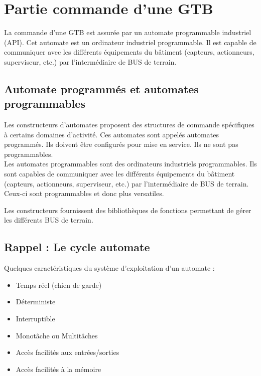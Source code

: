 \section{Partie commande d'une GTB}

La commande d'une GTB est assurée par un automate programmable industriel (API). Cet automate est un ordinateur industriel programmable. Il est capable de communiquer avec les différents équipements du bâtiment (capteurs, actionneurs, superviseur, etc.) par l'intermédiaire de BUS de terrain. 

\subsection{Automate programmés et automates programmables}
Les constructeurs d'automates proposent des structures de commande spécifiques à certains domaines d'activité. Ces automates sont appelés automates programmés. Ils doivent être configurés pour mise en service. Ils ne sont pas programmables.\\

Les automates programmables sont des ordinateurs industriels programmables. Ils sont capables de communiquer avec les différents équipements du bâtiment (capteurs, actionneurs, superviseur, etc.) par l'intermédiaire de BUS de terrain.
Ceux-ci sont programmables et donc plus versatiles. 

Les constructeurs fournissent des bibliothèques de fonctions permettant de gérer les différents BUS de terrain.

\subsection{Rappel : Le cycle automate}

\begin{minipage}{0.55\linewidth}
Quelques caractéristiques du système d'exploitation d'un automate :
\begin{itemize}
    \item Temps réel (chien de garde)
    \item Déterministe
    \item Interruptible
    \item Monotâche ou Multitâches 
    \item Accès facilités aux entrées/sorties
    \item Accès facilités à la mémoire
\end{itemize}
\end{minipage}
\begin{minipage}{0.4\linewidth}
    \begin{UPSTIactivite}
        \UPSTIeleveOnly{\vspace{7cm}}
    \end{UPSTIactivite}
\end{minipage}
